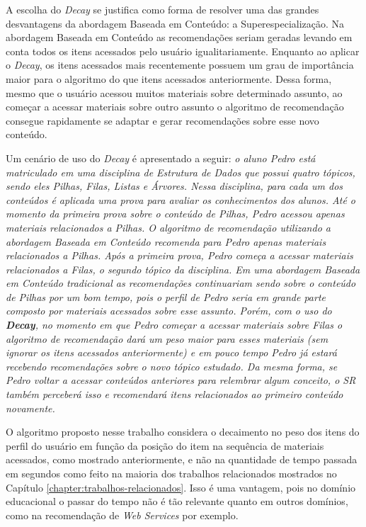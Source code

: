 A escolha do \textit{Decay} se justifica como forma de resolver uma das grandes desvantagens da abordagem Baseada em Conteúdo: a
Superespecialização. Na abordagem Baseada em Conteúdo as recomendações seriam geradas levando em conta todos os itens
acessados pelo usuário igualitariamente. Enquanto ao aplicar o \textit{Decay}, os itens acessados mais recentemente possuem um
grau de importância maior para o algoritmo do que itens acessados anteriormente. Dessa forma, mesmo que o usuário
acessou muitos materiais sobre determinado assunto, ao começar a acessar materiais sobre outro assunto o algoritmo de
recomendação consegue rapidamente se adaptar e gerar recomendações sobre esse novo conteúdo.

Um cenário de uso do \textit{Decay} é apresentado a seguir: \textit{o aluno Pedro está matriculado em uma disciplina de Estrutura de Dados
que possui quatro tópicos, sendo eles Pilhas, Filas, Listas e Árvores. Nessa disciplina, para cada um dos conteúdos é
aplicada uma prova para avaliar os conhecimentos dos alunos. Até o momento da primeira prova sobre o conteúdo de Pilhas,
Pedro acessou apenas materiais relacionados a Pilhas. O algoritmo de recomendação utilizando a abordagem Baseada em
Conteúdo recomenda para Pedro apenas materiais relacionados a Pilhas. Após a primeira prova, Pedro começa a acessar
materiais relacionados a Filas, o segundo tópico da disciplina. Em uma abordagem Baseada em Conteúdo tradicional as
recomendações continuariam sendo sobre o conteúdo de Pilhas por um bom tempo, pois o perfil de Pedro seria em grande
parte composto por materiais acessados sobre esse assunto. Porém, com o uso do \textbf{Decay}, no momento em que Pedro começar a
acessar materiais sobre Filas o algoritmo de recomendação dará um peso maior para esses materiais (sem ignorar os itens
acessados anteriormente) e em pouco tempo Pedro já estará recebendo recomendações sobre o novo tópico estudado. Da mesma
forma, se Pedro voltar a acessar conteúdos anteriores para relembrar algum conceito, o SR também perceberá isso e
recomendará itens relacionados ao primeiro conteúdo novamente.}

O algoritmo proposto nesse trabalho considera o decaimento no peso dos itens do perfil do usuário em função da posição
do item na sequência de materiais acessados, como mostrado anteriormente, e não na quantidade de tempo passada em
segundos como feito na maioria dos trabalhos relacionados mostrados no Capítulo \ref{chapter:trabalhos-relacionados}. Isso é uma vantagem, pois no domínio
educacional o passar do tempo não é tão relevante quanto em outros domínios, como na recomendação de \textit{Web Services} por
exemplo.

